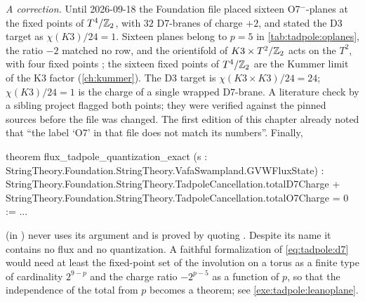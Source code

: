 \begin{leanbox}
\emph{A correction.} Until 2026-09-18 the Foundation file placed sixteen O7$^-$-planes at the
fixed points of $T^4/\mathbb{Z}_2$, with $32$ D7-branes of charge $+2$, and stated the D3 target as
$\chi(K3)/24=1$. Sixteen planes belong to $p=5$ in \cref{tab:tadpole:oplanes}, the ratio $-2$
matched no row, and the orientifold of $K3\times T^2/\mathbb{Z}_2$ acts on the $T^2$, with four fixed points
; the sixteen fixed points of $T^4/\mathbb{Z}_2$ are the
Kummer limit of the K3 factor (\cref{ch:kummer}). The D3 target is $\chi(K3\times K3)/24=24$;
$\chi(K3)/24=1$ is the charge of a single wrapped D7-brane. A literature check by a sibling
project flagged both points; they were verified against the pinned sources before the file
was changed. The first edition of this chapter already noted that ``the label `O7' in that
file does not match its numbers''. Finally,
\begin{leancode}
theorem flux_tadpole_quantization_exact
    (s : StringTheory.Foundation.StringTheory.VafaSwampland.GVWFluxState) :
    StringTheory.Foundation.StringTheory.TadpoleCancellation.totalD7Charge +
    StringTheory.Foundation.StringTheory.TadpoleCancellation.totalO7Charge
      = 0 := ...
\end{leancode}
(in ) never uses its argument
 and is proved by quoting . Despite its name it
contains no flux and no quantization. A faithful formalization of \eqref{eq:tadpole:d7} would
need at least the fixed-point set of the involution on a torus as a finite type of
cardinality $2^{9-p}$ and the charge ratio $-2^{p-5}$ as a function of $p$, so that the
independence of the total from $p$ becomes a theorem; see \cref{exe:tadpole:leanoplane}.
\end{leanbox}

